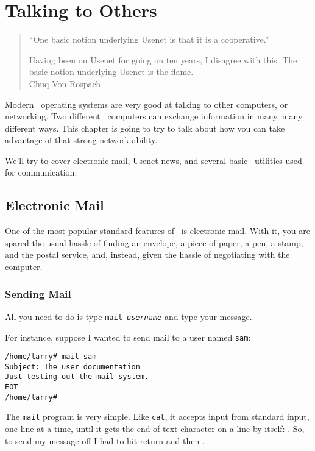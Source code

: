 \chapter{Talking to Others}\label{network-chapter}


\begin{quote}
``One basic notion underlying Usenet is that it is a cooperative.''

Having been on Usenet for going on ten years, I disagree with
this. The basic notion underlying Usenet is the flame.\\
\raggedleft Chuq Von Rospach
\end{quote}

Modern \unix\ operating systems are very good at talking to other
computers, or networking. Two different \unix\ computers can
exchange information in many, many different ways.  This chapter is
going to try to talk about how you can take advantage of that strong
network ability.

We'll try to cover electronic mail, Usenet news, and several basic
\unix\ utilities used for communication.

\section{Electronic Mail}

One of the most popular standard features of \unix\ is electronic
mail. With it, you are spared the usual hassle of finding an envelope,
a piece of paper, a pen, a stamp, and the postal service, and,
instead, given the hassle of negotiating with the computer.

\subsection{Sending Mail}

All you need to do is type {\tt mail {\sl username}}
and type your message.

For instance, suppose I wanted to send mail to a user named {\tt sam}:

\begin{screen}\begin{verbatim}
/home/larry# mail sam
Subject: The user documentation
Just testing out the mail system.
EOT
/home/larry#
\end{verbatim}\end{screen}

The {\tt mail} program is very simple. Like {\tt cat},
it accepts input from standard input, one line at a time, until it
gets the end-of-text character on a line by itself: \eof. So, to send
my message off I had to hit return and then \eof.

